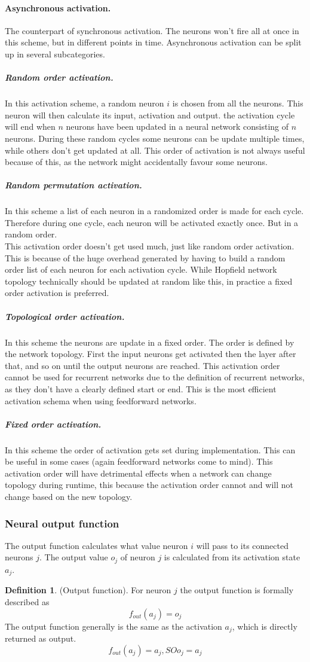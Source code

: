 \documentclass[pdftex,a4paper,12pt,twoside]{report}
\theoremstyle{plain} \newtheorem{theorem}{Theorem} \newtheorem{proposition}{Proposition} \newtheorem{lemma}{Lemma} \newtheorem*{corollary}{Corollary}
\theoremstyle{definition} \newtheorem{definition}{Definition} \newtheorem{conjecture}{Conjecture} \newtheorem*{example}{Example} \newtheorem{algorithm}{Algorithm}
\theoremstyle{remark} \newtheorem*{remark}{Remark} \newtheorem*{note}{Note} \newtheorem{case}{Case}
\begin{document}
\paragraph{Asynchronous activation.}
The counterpart of synchronous activation. The neurons won't fire all at once in this scheme, but in different points in time. Asynchronous activation can be split up in several subcategories. 
\subparagraph{Random order activation.}
In this activation scheme, a random neuron $i$ is chosen from all the neurons. This neuron will then calculate its input, activation and output. the activation cycle will end when $n$ neurons have been updated in a neural network consisting of $n$ neurons. During these random cycles some neurons can be update multiple times, while others don't get updated at all. This order of activation is not always useful because of this, as the network might accidentally favour some neurons.
\subparagraph{Random permutation activation.}
In this scheme a list of each neuron in a randomized order is made for each cycle. Therefore during one cycle, each neuron will be activated exactly once. But in a random order.\\
This activation order doesn't get used much, just like random order activation. This is because of the huge overhead generated by having to build a random order list of each neuron for each activation cycle. While Hopfield network topology technically should be updated at random like this, in practice a fixed order activation is preferred.
\subparagraph{Topological order activation.}
In this scheme the neurons are update in a fixed order. The order is defined by the network topology. First the input neurons get activated then the layer after that, and so on until the output neurons are reached. This activation order cannot be used for recurrent networks due to the definition of recurrent networks, as they don't have a clearly defined start or end. This is the most efficient activation schema when using feedforward networks.
\subparagraph{Fixed order activation.}
In this scheme the order of activation gets set during implementation. This can be useful in some cases (again feedforward networks come to mind). This activation order will have detrimental effects when a network can change topology during runtime, this because the activation order cannot and will not change based on the new topology.
\subsubsection{Neural output function}
The output function calculates what value neuron $i$ will pass to its connected neurons $j$. The output value $o_j$  of neuron $j$ is calculated from its activation state $a_j$.
\begin{definition}
(Output function). For neuron $j$ the output function is formally described as
\begin{equation}
f _{out}(a_j) = o_j
\end{equation}
The output function generally is the same as the activation $a_j$, which is directly returned as output.
\begin{equation}
f _{out}(a_j) = a_j,SO o_j = a_j
\end{equation}
\end{definition}
\end{document}
